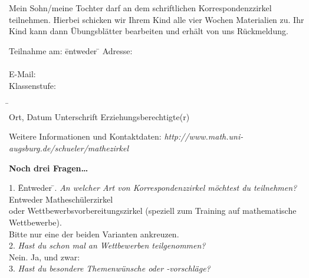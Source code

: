 \documentclass{mamazettel}
\begin{document}
\renewcommand{\betreff}{Anmeldung zum Matheschülerzirkel der Universität Augsburg}

\makeletterhead

Mein Sohn/meine Tochter \freistLang{} darf an dem schriftlichen Korrespondenzzirkel
teilnehmen. Hierbei schicken wir Ihrem Kind alle vier Wochen Materialien zu.
Ihr Kind kann dann Übungsblätter bearbeiten und erhält von uns Rückmeldung.

\doublespacing

\begin{tabbing}
  Teilnahme am: \= entweder \= \kill
  Adresse: \> \freistLang \\
  \> \freistLang \\
  E-Mail: \> \freistLang \\
  Klassenstufe: \> \freistKurz
\end{tabbing}

\begin{tabbing}
  \freistMittel \qquad\qquad \= \kill
  \freistMittel \> \freistLaenger \\
  Ort, Datum \> Unterschrift Erziehungsberechtigte(r)
\end{tabbing}

\vspace{-1.2em}
\scriptsize
Weitere Informationen und Kontaktdaten:
\textsl{http:/\!/www.math.uni-augsburg.de/schueler/mathezirkel}

\small
\onehalfspacing

\vfill
\textbf{Noch drei Fragen\ldots}
\vspace{-1.3em}
\begin{tabbing}
  1. \= Entweder \= . \> \emph{An welcher Art von Korrespondenzzirkel möchtest du teilnehmen?} \\
  \> Entweder \> \checkbox Matheschülerzirkel \\
  \> oder \> \checkbox
  Wettbewerbsvorbereitungszirkel (speziell zum Training auf mathematische \\
  \> \>  Wettbewerbe). \\
  \> Bitte nur eine der beiden Varianten ankreuzen. \\
  2. \> \emph{Hast du schon mal an Wettbewerben teilgenommen?} \\
  \> \checkbox Nein. \quad \checkbox Ja, und zwar: \freist{10.8cm} \\
  3. \> \emph{Hast du besondere Themenwünsche oder -vorschläge?} \\[0.5em]
  \> \freist{16cm}
\end{tabbing}
\end{document}
